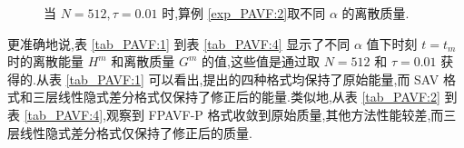 \begin{figure}[H]
\begin{center}
{	%
	}
	\caption{当 $N = 512, \tau=0.01$ 时,算例 \ref{exp_PAVF:2}取不同 $\alpha$ 的离散质量.}
	 \label{fig_PAVF:4}
	\end{center}
	\end{figure}

	更准确地说,表 \ref{tab_PAVF:1} 到表 \ref{tab_PAVF:4} 显示了不同 $\alpha$ 值下时刻 $t=t_{m}$ 时的离散能量 $H^{m}$ 和离散质量 $G^{m}$ 的值,这些值是通过取 $N=512$ 和 $\tau=0.01$ 获得的.从表 \ref{tab_PAVF:1} 可以看出,提出的四种格式均保持了原始能量,而 SAV 格式和三层线性隐式差分格式仅保持了修正后的能量.类似地,从表 \ref{tab_PAVF:2} 到表 \ref{tab_PAVF:4},观察到 FPAVF-P 格式收敛到原始质量,其他方法性能较差,而三层线性隐式差分格式仅保持了修正后的质量.

